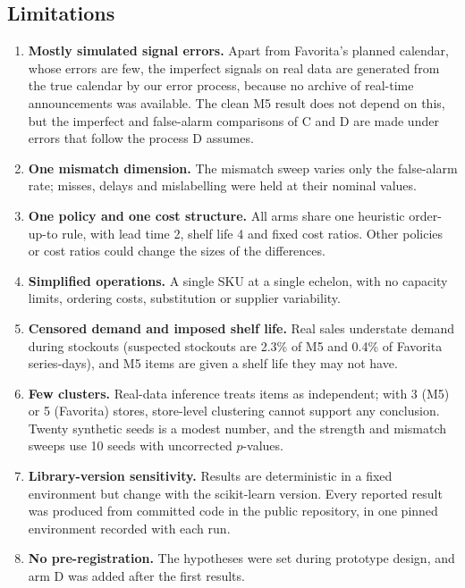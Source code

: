 \subsection{Limitations}
\begin{enumerate}
    \item \textbf{Mostly simulated signal errors.} Apart from Favorita's planned calendar, whose errors are few, the imperfect signals on real data are generated from the true calendar by our error process, because no archive of real-time announcements was available. The clean M5 result does not depend on this, but the imperfect and false-alarm comparisons of C and D are made under errors that follow the process D assumes.
    \item \textbf{One mismatch dimension.} The mismatch sweep varies only the false-alarm rate; misses, delays and mislabelling were held at their nominal values.
    \item \textbf{One policy and one cost structure.} All arms share one heuristic order-up-to rule, with lead time 2, shelf life 4 and fixed cost ratios. Other policies or cost ratios could change the sizes of the differences.
    \item \textbf{Simplified operations.} A single SKU at a single echelon, with no capacity limits, ordering costs, substitution or supplier variability.
    \item \textbf{Censored demand and imposed shelf life.} Real sales understate demand during stockouts (suspected stockouts are 2.3\% of M5 and 0.4\% of Favorita series-days), and M5 items are given a shelf life they may not have.
    \item \textbf{Few clusters.} Real-data inference treats items as independent; with 3 (M5) or 5 (Favorita) stores, store-level clustering cannot support any conclusion. Twenty synthetic seeds is a modest number, and the strength and mismatch sweeps use 10 seeds with uncorrected $p$-values.
    \item \textbf{Library-version sensitivity.} Results are deterministic in a fixed environment but change with the scikit-learn version. Every reported result was produced from committed code in the public repository, in one pinned environment recorded with each run.
    \item \textbf{No pre-registration.} The hypotheses were set during prototype design, and arm D was added after the first results.
\end{enumerate}

